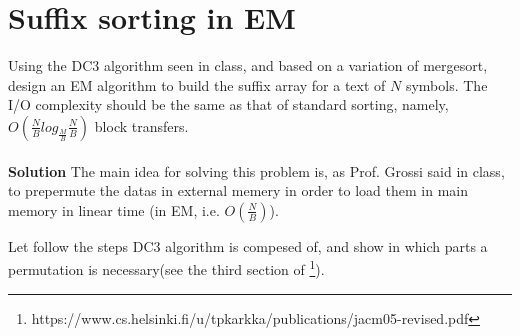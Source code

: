 \documentclass[a4paper]{article}
\begin{document}
\section*{Suffix sorting in EM}
Using the DC3 algorithm seen in class, and based on a variation
of mergesort, design an EM algorithm to build the suffix array for a text of $N$
symbols. The I/O complexity should be the same as that of standard sorting, namely,
$O(\frac{N}{B} log_{\frac{M}{B}} \frac{N}{B})$ block transfers.
\\
\\
\textbf{Solution}
The main idea for solving this problem is, as Prof. Grossi said in class, to prepermute the datas in external memery in order to load them in main memory in linear time (in EM, i.e. $O(\frac{N}{B})$).

Let follow the steps DC3 algorithm is compesed of, and show in which parts a permutation is necessary(see the third section of \footnote{https://www.cs.helsinki.fi/u/tpkarkka/publications/jacm05-revised.pdf}).
\end{document}
